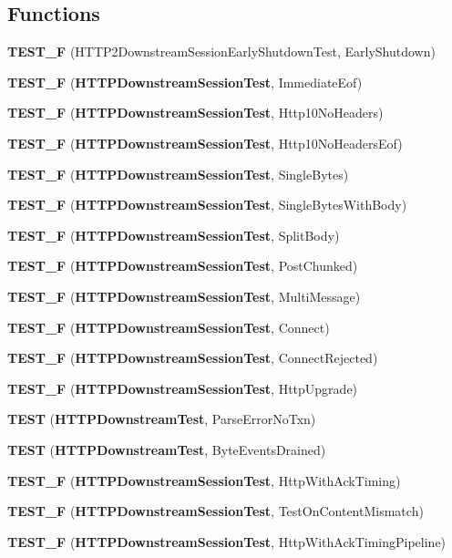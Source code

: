 \subsection*{Functions}
\begin{DoxyCompactItemize}
\item 
{\bf T\+E\+S\+T\+\_\+F} (H\+T\+T\+P2\+Downstream\+Session\+Early\+Shutdown\+Test, Early\+Shutdown)
\item 
{\bf T\+E\+S\+T\+\_\+F} ({\bf H\+T\+T\+P\+Downstream\+Session\+Test}, Immediate\+Eof)
\item 
{\bf T\+E\+S\+T\+\_\+F} ({\bf H\+T\+T\+P\+Downstream\+Session\+Test}, Http10\+No\+Headers)
\item 
{\bf T\+E\+S\+T\+\_\+F} ({\bf H\+T\+T\+P\+Downstream\+Session\+Test}, Http10\+No\+Headers\+Eof)
\item 
{\bf T\+E\+S\+T\+\_\+F} ({\bf H\+T\+T\+P\+Downstream\+Session\+Test}, Single\+Bytes)
\item 
{\bf T\+E\+S\+T\+\_\+F} ({\bf H\+T\+T\+P\+Downstream\+Session\+Test}, Single\+Bytes\+With\+Body)
\item 
{\bf T\+E\+S\+T\+\_\+F} ({\bf H\+T\+T\+P\+Downstream\+Session\+Test}, Split\+Body)
\item 
{\bf T\+E\+S\+T\+\_\+F} ({\bf H\+T\+T\+P\+Downstream\+Session\+Test}, Post\+Chunked)
\item 
{\bf T\+E\+S\+T\+\_\+F} ({\bf H\+T\+T\+P\+Downstream\+Session\+Test}, Multi\+Message)
\item 
{\bf T\+E\+S\+T\+\_\+F} ({\bf H\+T\+T\+P\+Downstream\+Session\+Test}, Connect)
\item 
{\bf T\+E\+S\+T\+\_\+F} ({\bf H\+T\+T\+P\+Downstream\+Session\+Test}, Connect\+Rejected)
\item 
{\bf T\+E\+S\+T\+\_\+F} ({\bf H\+T\+T\+P\+Downstream\+Session\+Test}, Http\+Upgrade)
\item 
{\bf T\+E\+ST} ({\bf H\+T\+T\+P\+Downstream\+Test}, Parse\+Error\+No\+Txn)
\item 
{\bf T\+E\+ST} ({\bf H\+T\+T\+P\+Downstream\+Test}, Byte\+Events\+Drained)
\item 
{\bf T\+E\+S\+T\+\_\+F} ({\bf H\+T\+T\+P\+Downstream\+Session\+Test}, Http\+With\+Ack\+Timing)
\item 
{\bf T\+E\+S\+T\+\_\+F} ({\bf H\+T\+T\+P\+Downstream\+Session\+Test}, Test\+On\+Content\+Mismatch)
\item 
{\bf T\+E\+S\+T\+\_\+F} ({\bf H\+T\+T\+P\+Downstream\+Session\+Test}, Http\+With\+Ack\+Timing\+Pipeline)
\item 

\end{DoxyCompactItemize}

